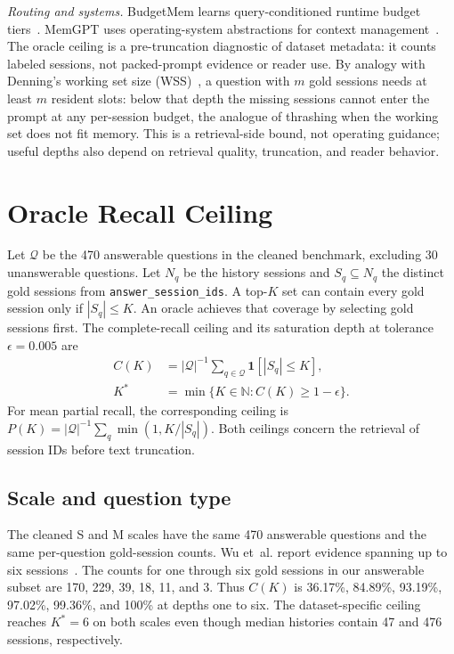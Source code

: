\textit{Routing and systems.} BudgetMem learns query-conditioned runtime budget tiers~\cite{zhang2026budgetmem}. MemGPT uses operating-system abstractions for context management~\cite{packer2023memgpt}. The oracle ceiling is a pre-truncation diagnostic of dataset metadata: it counts labeled sessions, not packed-prompt evidence or reader use. By analogy with Denning's working set size (WSS)~\cite{denning1968workingset}, a question with $m$ gold sessions needs at least $m$ resident slots: below that depth the missing sessions cannot enter the prompt at any per-session budget, the analogue of thrashing when the working set does not fit memory. This is a retrieval-side bound, not operating guidance; useful depths also depend on retrieval quality, truncation, and reader behavior.

\section{Oracle Recall Ceiling}
\label{sec:ceiling}

Let $\mathcal Q$ be the 470 answerable questions in the cleaned benchmark, excluding 30 unanswerable questions. Let $N_q$ be the history sessions and $S_q\subseteq N_q$ the distinct gold sessions from \texttt{answer\_session\_ids}. A top-$K$ set can contain every gold session only if $|S_q|\le K$. An oracle achieves that coverage by selecting gold sessions first. The complete-recall ceiling and its saturation depth at tolerance $\epsilon=0.005$ are
\begin{align}
C(K) &= |\mathcal Q|^{-1}\sum_{q\in\mathcal Q}\mathbf{1}[|S_q|\le K], \\
K^* &= \min\{K\in\mathbb N:C(K)\ge 1-\epsilon\}.
\end{align}
For mean partial recall, the corresponding ceiling is $P(K)=|\mathcal Q|^{-1}\sum_q\min(1,K/|S_q|)$. Both ceilings concern the retrieval of session IDs before text truncation.

\subsection{Scale and question type}

The cleaned S and M scales have the same 470 answerable questions and the same per-question gold-session counts. Wu et~al. report evidence spanning up to six sessions~\cite{wu2025longmemeval}. The counts for one through six gold sessions in our answerable subset are 170, 229, 39, 18, 11, and 3. Thus $C(K)$ is 36.17\%, 84.89\%, 93.19\%, 97.02\%, 99.36\%, and 100\% at depths one to six. The dataset-specific ceiling reaches $K^*=6$ on both scales even though median histories contain 47 and 476 sessions, respectively.

